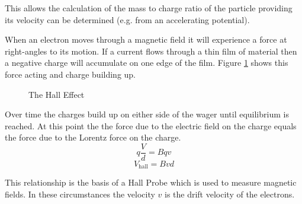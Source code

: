 \documentclass[main.tex]{subfiles}
\begin{document}
This allows the calculation of the mass to charge ratio of the particle providing its velocity can be determined (e.g. from an accelerating potential).

\newpage
{}

When an electron moves through a magnetic field it will experience a force at right-angles to its motion. If a current flows through a thin film of material then a negative charge will accumulate on one edge of the film. Figure \ref{halleffect} shows this force acting and charge building up.

\begin{figure}[h]
  \begin{center}
  \end{center}
  \caption{The Hall Effect}
  \label{halleffect}
\end{figure}

Over time the charges build up on either side of the wager until equilibrium is reached. At this point the the force due to the electric field on the charge equals the force due to the Lorentz force on the charge.
$$ q\frac{V}{d} = Bqv $$
$$ V_\text{hall} = Bvd $$

This relationship is the basis of a Hall Probe which is used to measure magnetic fields. In these circumstances the velocity $v$ is the drift velocity of the electrons.
\end{document}
